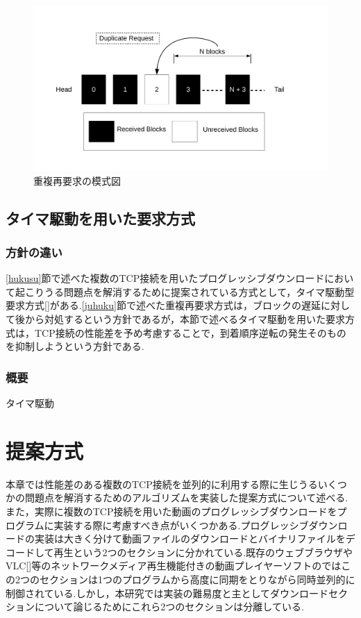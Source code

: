 \documentclass[a4j,12pt]{gradthesis_utf8}
\begin{document}
 \begin{figure}[h]
 	\centering
 	\includegraphics[width=18cm]{block_dup.pdf}
 	\caption{重複再要求の模式図}
 	\label{blockdup}
 \end{figure}

\newpage
 
 
 \section{タイマ駆動を用いた要求方式}
 \subsection{方針の違い}
 \ref{hukusu}節で述べた複数のTCP接続を用いたプログレッシブダウンロードにおいて起こりうる問題点を解消するために提案されている方式として，タイマ駆動型要求方式[]がある.\ref{juhuku}節で述べた重複再要求方式は，ブロックの遅延に対して後から対処するという方針であるが，本節で述べるタイマ駆動を用いた要求方式は，TCP接続の性能差を予め考慮することで，到着順序逆転の発生そのものを抑制しようという方針である.
 \subsection{概要}
 タイマ駆動
 
\chapter{提案方式}\label{sec:sec3}
本章では性能差のある複数のTCP接続を並列的に利用する際に生じうるいくつかの問題点を解消するためのアルゴリズムを実装した提案方式について述べる.\\
また，実際に複数のTCP接続を用いた動画のプログレッシブダウンロードをプログラムに実装する際に考慮すべき点がいくつかある.プログレッシブダウンロードの実装は大きく分けて動画ファイルのダウンロードとバイナリファイルをデコードして再生という2つのセクションに分かれている.既存のウェブブラウザやVLC[]等のネットワークメディア再生機能付きの動画プレイヤーソフトのではこの2つのセクションは1つのプログラムから高度に同期をとりながら同時並列的に制御されている.しかし，本研究では実装の難易度と主としてダウンロードセクションについて論じるためにこれら2つのセクションは分離している.
\end{document}
